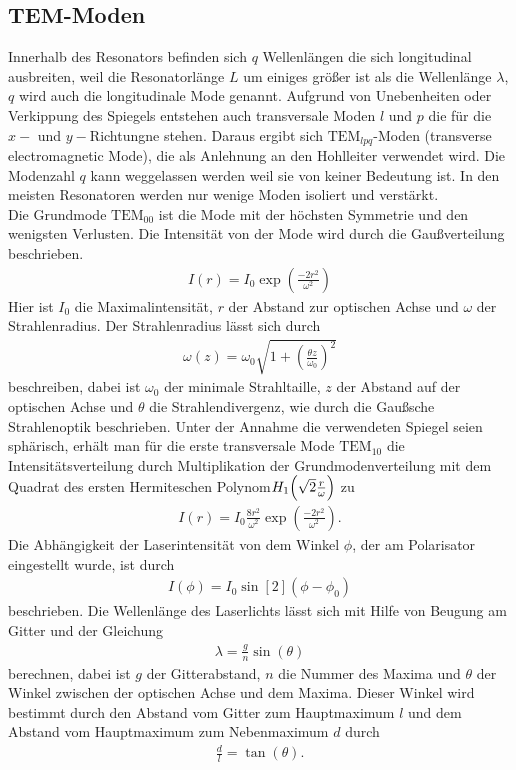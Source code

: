 \subsection[TEM-Moden]{$\mathbf{TEM}$-Moden}
Innerhalb des Resonators befinden sich $q$ Wellenlängen die sich longitudinal ausbreiten, weil die Resonatorlänge $L$ um einiges größer ist als die Wellenlänge $\lambda$, $q$ wird auch die longitudinale Mode genannt. Aufgrund von Unebenheiten oder Verkippung des Spiegels entstehen auch transversale Moden $l$ und $p$ die für die $x-$ und $y-$Richtungne stehen. Daraus ergibt sich $\mathrm{TEM}_{lpq}$-Moden (transverse electromagnetic Mode), die als Anlehnung an den Hohlleiter verwendet wird. Die Modenzahl $q$ kann weggelassen werden weil sie von keiner Bedeutung ist. In den meisten Resonatoren werden nur wenige Moden isoliert und verstärkt.\\

Die Grundmode $\mathrm{TEM}_{00}$ ist die Mode mit der höchsten Symmetrie und den wenigsten Verlusten. Die Intensität von der Mode wird durch die Gaußverteilung beschrieben.
\begin{align}
I(r)=I_0\exp\left(\frac{-2r^2}{\omega^2}\right)
\label{eq:tem00}
\end{align}
Hier ist $I_0$ die Maximalintensität, $r$ der Abstand zur optischen Achse und $\omega$ der Strahlenradius. Der Strahlenradius lässt sich durch
\begin{align}
\omega(z)=\omega_0 \sqrt{1+\left(\frac{\theta z}{\omega_0}\right)^2}
\end{align}
beschreiben, dabei ist $\omega_0$ der minimale Strahltaille, $z$ der Abstand auf der optischen Achse und $\theta$ die Strahlendivergenz, wie durch die Gaußsche 
Strahlenoptik beschrieben.
Unter der Annahme die verwendeten Spiegel seien sphärisch, erhält man für die erste transversale Mode $\mathrm{TEM}_{10}$ 
die Intensitätsverteilung durch Multiplikation der Grundmodenverteilung mit dem Quadrat des ersten Hermiteschen Polynom\footnotemark $H_1\qty(\sqrt{2}\frac{r}{\omega})$\cite{Demtroeder07}
zu
\begin{align}
I(r)=I_0\frac{8r^2}{\omega^2}\exp\left(\frac{-2r^2}{\omega^2}\right).
\label{eq:tem10}
\end{align}
Die Abhängigkeit der Laserintensität von dem Winkel $\phi$, der am Polarisator eingestellt wurde, ist durch
\begin{align}
I(\phi)=I_0\sin[2](\phi - \phi_0)
\label{eq:polarisation}
\end{align}
beschrieben. 
Die Wellenlänge des Laserlichts lässt sich mit Hilfe von Beugung am Gitter und der Gleichung
\begin{align}
\lambda=\frac{g}{n}\sin\left(  \theta \right)
\label{eq:gitter}
\end{align}
berechnen, dabei ist $g$ der Gitterabstand, $n$ die Nummer des Maxima und $\theta$ der Winkel zwischen der optischen Achse und dem Maxima. Dieser Winkel wird bestimmt durch den Abstand vom Gitter zum Hauptmaximum $l$ und dem Abstand vom  Hauptmaximum zum Nebenmaximum $d$ durch
\begin{align}
\frac{d}{l}=\tan\left( \theta \right).
\label{eq:gitter_winkel}
\end{align}


